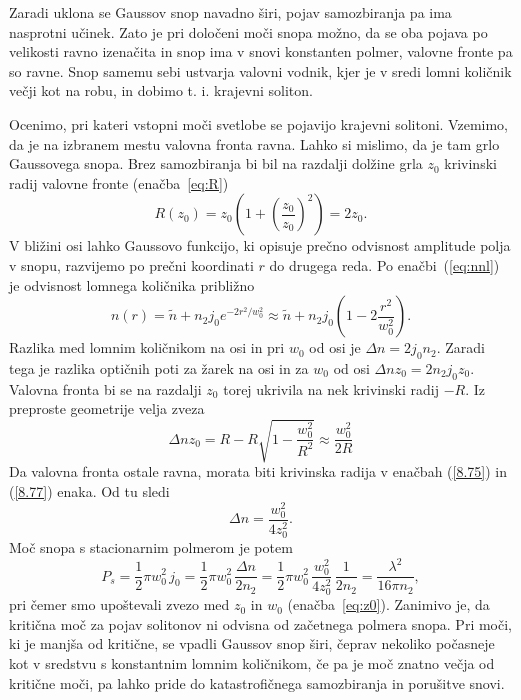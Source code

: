 Zaradi uklona se Gaussov snop navadno širi, pojav samozbiranja pa ima nasprotni
učinek. Zato je pri določeni moči snopa možno, da se oba pojava po
velikosti ravno izenačita in snop ima v snovi konstanten polmer, valovne
fronte pa so ravne. Snop samemu sebi ustvarja valovni vodnik, kjer
je v sredi lomni količnik večji kot na robu, in dobimo t. i. krajevni soliton.

Ocenimo, pri kateri vstopni moči svetlobe se pojavijo krajevni solitoni. 
Vzemimo, da je na izbranem mestu valovna fronta ravna. Lahko si mislimo,
da je tam grlo Gaussovega snopa. Brez samozbiranja bi bil na razdalji
dolžine grla $z_{0}$ krivinski radij valovne fronte (enačba~\ref{eq:R})
\begin{equation}
R(z_{0})=z_{0}\left( 1+\left(\frac{z_{0}}{z_{0}}\right)^{2}\right)=2z_{0}.
\label{8.75}
\end{equation}
V bližini osi lahko Gaussovo funkcijo, ki opisuje prečno odvisnost
amplitude polja v snopu, razvijemo po prečni koordinati $r$ do drugega
reda. Po enačbi~(\ref{eq:nnl}) je odvisnost lomnega količnika približno
\begin{equation}
n(r)=\tilde{n}+n_2 j_0 e^{-2r^2/w_0^2} \approx \tilde{n}+n_2 j_0 \left(1 - 2\frac{r^2}{w_0^2}\right).
\label{8.76}
\end{equation}
Razlika med lomnim količnikom na osi in pri $w_{0}$ od osi je $\Delta n= 2j_{0} n_{2}$.
Zaradi tega je razlika optičnih poti za žarek na osi in za $w_{0}$
od osi $\Delta nz_{0} = 2 n_2 j_0 z_0$. Valovna fronta bi se na razdalji $z_0$ torej
ukrivila na nek krivinski radij $-R$. Iz preproste geometrije velja zveza 
\begin{equation}
\Delta nz_{0}=R-R\sqrt{1-\frac{w_{0}^{2}}{R^{2}}}\approx \frac{w_{0}^{2}}{2R}
\label{8.77}
\end{equation}
Da valovna fronta ostale ravna, morata biti krivinska radija v
enačbah (\ref{8.75}) in (\ref{8.77}) enaka. Od tu sledi 
\begin{equation}
\Delta n=\frac{w_{0}^{2}}{4z_{0}^{2}}.
\label{8.78}
\end{equation}
Moč snopa s stacionarnim polmerom je potem 
\begin{equation}
P_{s}= \frac{1}{2}\pi w_0^2 \,j_0 = \frac{1}{2}\pi w_0^2 \, \frac{\Delta n}{2 n_2} = 
\frac{1}{2}\pi w_0^2 \,\frac{w_{0}^{2}}{4z_{0}^{2}}\,\frac{1}{2 n_2} = \frac{\lambda^2}{16 \pi n_2},
\label{8.79}
\end{equation}
pri čemer smo upoštevali zvezo med $z_0$ in $w_0$ (enačba~\ref{eq:z0}).
Zanimivo je, da kritična moč za pojav solitonov ni odvisna od začetnega polmera snopa.
Pri moči, ki je manjša od kritične, se vpadli Gaussov snop širi, 
čeprav nekoliko počasneje kot v sredstvu s konstantnim lomnim količnikom, 
če pa je moč znatno večja od kritične moči, pa lahko
pride do katastrofičnega samozbiranja in porušitve snovi.

